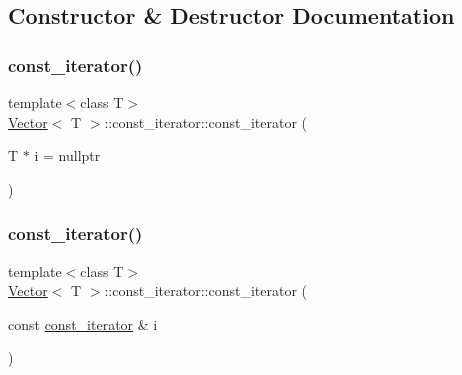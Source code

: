 \subsection{Constructor \& Destructor Documentation}
\mbox{\label{classVector_1_1const__iterator_afa2f13d4f57db06cc18b08d1250108de_afa2f13d4f57db06cc18b08d1250108de}} 
\subsubsection{\texorpdfstring{const\+\_\+iterator()}{const\_iterator()}\hspace{0.1cm}{\footnotesize\ttfamily [1/2]}}
{\footnotesize\ttfamily template$<$class T$>$ \\
\hyperlink{classVector}{Vector}$<$ T $>$\+::const\+\_\+iterator\+::const\+\_\+iterator (\begin{DoxyParamCaption}\item[{T $\ast$}]{i = {\ttfamily nullptr} }\end{DoxyParamCaption})\hspace{0.3cm}{\ttfamily [inline]}}

\mbox{\label{classVector_1_1const__iterator_ab513d0d4c5a9f0d66b8300bb39e762be_ab513d0d4c5a9f0d66b8300bb39e762be}} 
\subsubsection{\texorpdfstring{const\+\_\+iterator()}{const\_iterator()}\hspace{0.1cm}{\footnotesize\ttfamily [2/2]}}
{\footnotesize\ttfamily template$<$class T$>$ \\
\hyperlink{classVector}{Vector}$<$ T $>$\+::const\+\_\+iterator\+::const\+\_\+iterator (\begin{DoxyParamCaption}\item[{const \hyperlink{classVector_1_1const__iterator}{const\+\_\+iterator} \&}]{i }\end{DoxyParamCaption})\hspace{0.3cm}{\ttfamily [inline]}}



